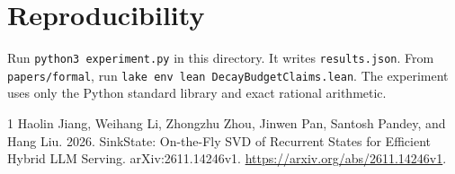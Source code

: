 \documentclass[11pt]{article}
\begin{document}
\section*{Reproducibility}
Run \texttt{python3 experiment.py} in this directory. It writes \texttt{results.json}. From \texttt{papers/formal}, run \texttt{lake env lean DecayBudgetClaims.lean}. The experiment uses only the Python standard library and exact rational arithmetic.

\begin{thebibliography}{1}
Haolin Jiang, Weihang Li, Zhongzhu Zhou, Jinwen Pan, Santosh Pandey, and Hang Liu. 2026. SinkState: On-the-Fly SVD of Recurrent States for Efficient Hybrid LLM Serving. arXiv:2611.14246v1. \url{https://arxiv.org/abs/2611.14246v1}.
\end{thebibliography}
\end{document}

